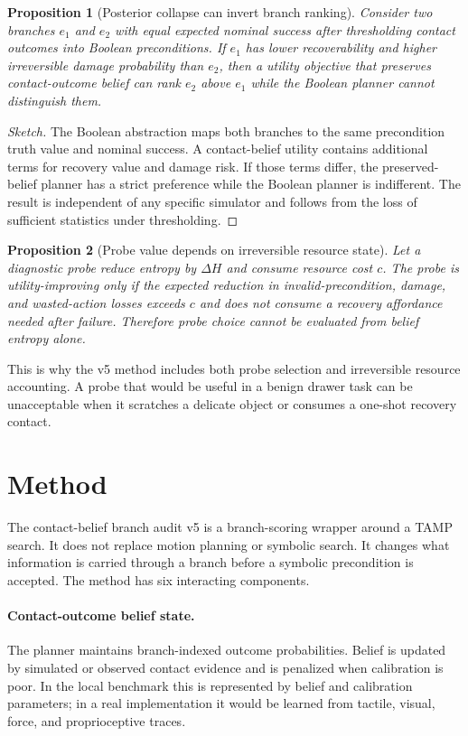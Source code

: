 \documentclass{article}
\newtheorem{proposition}{Proposition}
\newcommand{\method}{contact-belief branch audit v5}
\begin{document}
\begin{proposition}[Posterior collapse can invert branch ranking]
Consider two branches $e_1$ and $e_2$ with equal expected nominal success after thresholding contact outcomes into Boolean preconditions. If $e_1$ has lower recoverability and higher irreversible damage probability than $e_2$, then a utility objective that preserves contact-outcome belief can rank $e_2$ above $e_1$ while the Boolean planner cannot distinguish them.
\end{proposition}

\begin{proof}[Sketch]
The Boolean abstraction maps both branches to the same precondition truth value and nominal success. A contact-belief utility contains additional terms for recovery value and damage risk. If those terms differ, the preserved-belief planner has a strict preference while the Boolean planner is indifferent. The result is independent of any specific simulator and follows from the loss of sufficient statistics under thresholding.
\end{proof}

\begin{proposition}[Probe value depends on irreversible resource state]
Let a diagnostic probe reduce entropy by $\Delta H$ and consume resource cost $c$. The probe is utility-improving only if the expected reduction in invalid-precondition, damage, and wasted-action losses exceeds $c$ and does not consume a recovery affordance needed after failure. Therefore probe choice cannot be evaluated from belief entropy alone.
\end{proposition}

This is why the v5 method includes both probe selection and irreversible resource accounting. A probe that would be useful in a benign drawer task can be unacceptable when it scratches a delicate object or consumes a one-shot recovery contact.

\section{Method}
The \method{} is a branch-scoring wrapper around a TAMP search. It does not replace motion planning or symbolic search. It changes what information is carried through a branch before a symbolic precondition is accepted. The method has six interacting components.

\paragraph{Contact-outcome belief state.}
The planner maintains branch-indexed outcome probabilities. Belief is updated by simulated or observed contact evidence and is penalized when calibration is poor. In the local benchmark this is represented by belief and calibration parameters; in a real implementation it would be learned from tactile, visual, force, and proprioceptive traces.
\end{document}
